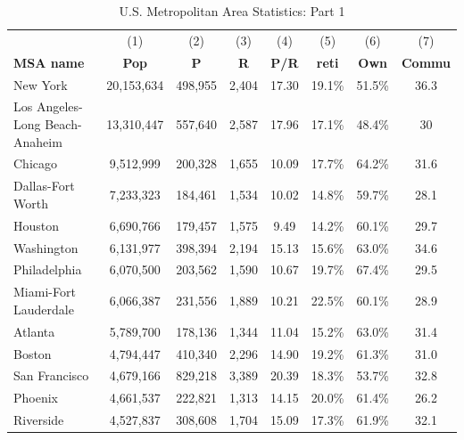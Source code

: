 \documentclass[letterpaper,12pt,dvipsnames,usenames]{article}
\theoremstyle{definition}
\begin{document}
\begin{spacing}{1.0}
\begin{small}
\begin{table}
\caption{U.S. Metropolitan Area Statistics: Part 1}\label{table:msas}
\setlength{\tabcolsep}{5pt}
\renewcommand{\arraystretch}{1.05}
\begin{center}
{\scriptsize
    \begin{tabular}{lccccccc}
    \hline &  (1) & (2) & (3) & (4) & (5) & (6) & (7)\\
        \textbf{MSA name} & \textbf{Pop} & \textbf{P} & \textbf{R} & \textbf{P/R} & \textbf{reti} & \textbf{Own} & \textbf{Commu} \\     \hline
    New York & 20,153,634 & 498,955  &   2,404 & 17.30 & 19.1\% & 51.5\% & 36.3 \\
    Los Angeles-Long Beach-Anaheim &            13,310,447  &          557,640  &          2,587  & 17.96 & 17.1\% & 48.4\% & 30\\
    Chicago &               9,512,999  &          200,328  &          1,655  & 10.09 & 17.7\% & 64.2\% & 31.6\\
    Dallas-Fort Worth &               7,233,323  &          184,461  &          1,534  & 10.02 & 14.8\% & 59.7\% & 28.1 \\
    Houston &               6,690,766  &          179,457  &          1,575  & 9.49  & 14.2\% & 60.1\% & 29.7\\
    Washington &               6,131,977  &          398,394  &          2,194  & 15.13 & 15.6\% & 63.0\% & 34.6 \\
    Philadelphia &               6,070,500  &          203,562  &          1,590  & 10.67 & 19.7\% & 67.4\% & 29.5 \\
    Miami-Fort Lauderdale &               6,066,387  &          231,556  &          1,889  & 10.21 & 22.5\% & 60.1\% & 28.9\\
    Atlanta &               5,789,700  &          178,136  &          1,344  & 11.04 & 15.2\% & 63.0\% & 31.4 \\
    Boston &               4,794,447  &          410,340  &          2,296  & 14.90 & 19.2\% & 61.3\% & 31.0\\
    San Francisco &               4,679,166  &          829,218  &          3,389  & 20.39 & 18.3\% & 53.7\%& 32.8 \\
    Phoenix &               4,661,537  &          222,821  &          1,313  & 14.15 & 20.0\% & 61.4\% & 26.2\\
    Riverside &               4,527,837  &          308,608  &          1,704  & 15.09 & 17.3\% & 61.9\% & 32.1\\

\end{tabular}}
\end{center}
\end{table}
\end{small}
\end{spacing}
\end{document}
